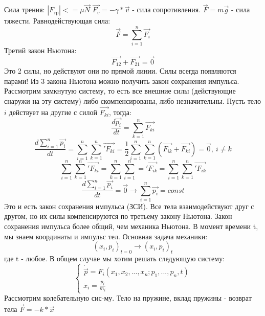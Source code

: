  \newline Сила трения: $|F_{тр}| <= \mu \vec{N}$
 \newline $\Vec{F_v} = -\gamma * \Vec{v}$ - сила сопротивления.
 \newline $\Vec{F} = m\Vec{g}$ - сила тяжести.
 \newline Равнодействующая сила:
 \[\Vec{F} = \sum\limits_{i=1}^n \Vec{F_i}\]
 \newline Третий закон Ньютона:
 \[\Vec{F_{12}} + \Vec{F_{21}} = \Vec{0}\]
 Это 2 силы, но действуют они по прямой линии. Силы всегда появляются парами! 
 \newline Из 3 закона Ньютона можно получить закон сохранения импульса.
 \newline Рассмотрим замкнутую систему, то есть все внешние силы (действующие снаружи на эту систему) либо скомпенсированы, либо незначительны. 
 \newline Пусть тело $i$ действует на другие с силой $\vec{F_{ki}}$, тогда:
 \[ \frac{d\vec{p_i}}{dt} = \sum\limits_{k = 1}^n \Vec{F_{ki}}\]
 \[ \frac{d\sum\limits_{i = 1}^n \Vec{p_i}}{dt} = \sum\limits_{i = 1}^n\sum\limits_{k = 1}^n \Vec{'F_{ki}} = \frac{1}{2}\sum\limits_{i = 1}^n\sum\limits_{k = 1}^n (\Vec{F_{ik}} + \Vec{F_{ki}}) = \Vec{0}, \ i \neq k\] \[ \sum\limits_{i = 1}^n\sum\limits_{k = 1}^n \Vec{'F_{ki}} = \sum\limits_{k = 1}^n\sum\limits_{i = 1}^n = \Vec{'F_{ik}} = \sum\limits_{i = 1}^n\sum\limits_{k = 1}^n \Vec{'F_{ik}}\]
 \[\frac{d\sum\limits_{i = 1}^n \Vec{p_i}}{dt} = \Vec{0} \rightarrow \sum\limits_{i=1}^n \vec{p_i} = const\]
 Это и есть закон сохранения импульса (ЗСИ).
 Все тела взаимодействуют друг с другом, но их силы компенсируются по третьему закону Ньютона. 
 Закон сохранения импульса более общий, чем механика Ньютона. 
 В момент времени t, мы знаем координаты и импульс тел.
 \newline 
 Основная задача механики:
 \[(x_i, p_i)_{t = 0} \rightarrow (x_i, p_i)_t\]
 где t - любое.
 \newline В общем случае мы хотим решать следующую систему:
 \begin{equation}
     \begin{cases}
         \dot \vec{p} = F_i(x_1, x_2, ..., x_n; p_1, ..., p_n, t)
         \\
         \dot x_i = \frac{p_i}{m_i}
     \end{cases}
 \end{equation}
 \newline Рассмотрим колебательную сис-му.
 Тело на пружине, вклад пружины - возврат тела $\vec{F} = -k * \vec{x}$
